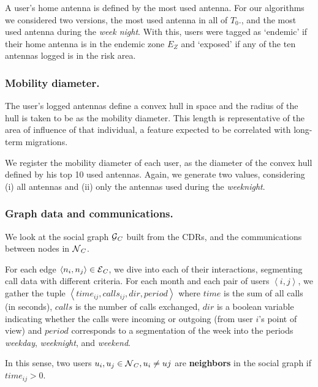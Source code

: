 A user's home antenna is defined by the most used antenna. For our algorithms we considered two versions, the most used antenna in all of $T_0$., and the most used antenna during the \textit{week night}.
With this, users were tagged as `endemic' if their home antenna is in the endemic zone $E_Z$ and `exposed' if any of the ten antennas logged is in the risk area.


\subsubsection{Mobility diameter.}

The user's logged antennas define a convex hull in space and the radius of the hull is taken to be as the mobility diameter. This length is representative of the area of influence of that individual, a feature expected to be correlated with long-term migrations.

We register the mobility diameter of each user, as the diameter of the convex hull defined by his top 10 used antennas. Again, we generate two values, considering (i) all antennas and (ii) only the antennas used during the \textit{weeknight}.



\subsubsection{Graph data and communications.}

We look at the social graph $\operatorname{\mathcal{G}}_C$ built from the CDRs, and the communications between nodes in $\operatorname{\mathcal{N}}_C$.

For each edge $\left< n_i, n_j \right> \in \operatorname{\mathcal{E}}_C$, we dive into each of their interactions, segmenting call data with different criteria. For %
each month and each pair of users $\left< i,j \right>$, we gather the tuple $\left< time_{ij}, calls_{ij}, dir, period \right>$ where $time$ is the sum of all calls (in seconds), $calls$ is the number of calls exchanged, $dir$ is a boolean variable indicating whether the calls were incoming or outgoing (from user $i$'s point of view) and $period$ corresponds to a segmentation of the week into the periods \textit{weekday}, \textit{weeknight}, and \textit{weekend}.


In this sense, two users $u_i, u_j \in \operatorname{\mathcal{N}}_C, u_i \neq uj$ are \textbf{neighbors} in the social graph if $time_{ij} > 0$.


